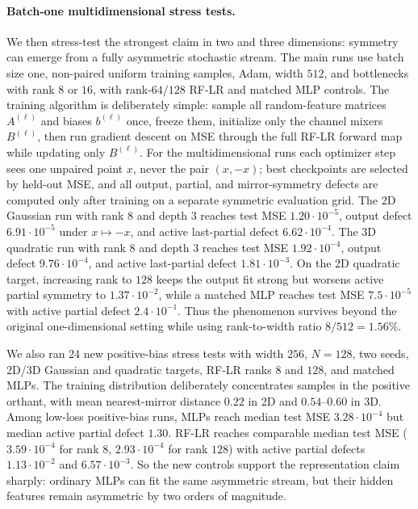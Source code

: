 \documentclass[nohyperref]{article}
\begin{document}
\paragraph{Batch-one multidimensional stress tests.}
We then stress-test the strongest claim in two and three dimensions: symmetry can emerge from a fully asymmetric stochastic stream.
The main runs use batch size one, non-paired uniform training samples, Adam, width $512$, and bottlenecks with rank $8$ or $16$, with rank-$64/128$ RF-LR and matched MLP controls.
The training algorithm is deliberately simple: sample all random-feature matrices $A^{(\ell)}$ and biases $b^{(\ell)}$ once, freeze them, initialize only the channel mixers $B^{(\ell)}$, then run gradient descent on MSE through the full RF-LR forward map while updating only $B^{(\ell)}$.
For the multidimensional runs each optimizer step sees one unpaired point $x$, never the pair $(x,-x)$; best checkpoints are selected by held-out MSE, and all output, partial, and mirror-symmetry defects are computed only after training on a separate symmetric evaluation grid.
The 2D Gaussian run with rank $8$ and depth $3$ reaches test MSE $1.20\cdot10^{-5}$, output defect $6.91\cdot10^{-5}$ under $x\mapsto -x$, and active last-partial defect $6.62\cdot10^{-4}$.
The 3D quadratic run with rank $8$ and depth $3$ reaches test MSE $1.92\cdot10^{-4}$, output defect $9.76\cdot10^{-4}$, and active last-partial defect $1.81\cdot10^{-3}$.
On the 2D quadratic target, increasing rank to $128$ keeps the output fit strong but worsens active partial symmetry to $1.37\cdot10^{-2}$, while a matched MLP reaches test MSE $7.5\cdot10^{-5}$ with active partial defect $2.4\cdot10^{-1}$.
Thus the phenomenon survives beyond the original one-dimensional setting while using rank-to-width ratio $8/512=1.56\%$.

We also ran 24 new positive-bias stress tests with width $256$, $N=128$, two seeds, 2D/3D Gaussian and quadratic targets, RF-LR ranks $8$ and $128$, and matched MLPs.
The training distribution deliberately concentrates samples in the positive orthant, with mean nearest-mirror distance $0.22$ in 2D and $0.54$--$0.60$ in 3D.
Among low-loss positive-bias runs, MLPs reach median test MSE $3.28\cdot10^{-4}$ but median active partial defect $1.30$.
RF-LR reaches comparable median test MSE ($3.59\cdot10^{-4}$ for rank $8$, $2.93\cdot10^{-4}$ for rank $128$) with active partial defects $1.13\cdot10^{-2}$ and $6.57\cdot10^{-3}$.
So the new controls support the representation claim sharply: ordinary MLPs can fit the same asymmetric stream, but their hidden features remain asymmetric by two orders of magnitude.
\end{document}
